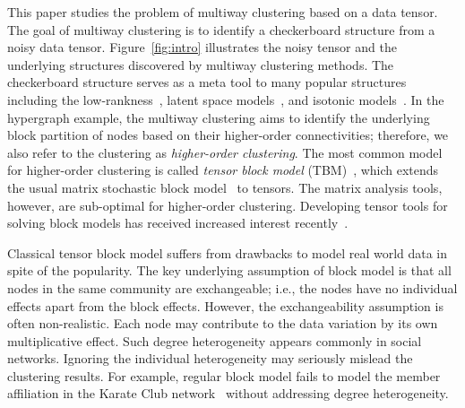 \documentclass[lettersize,onecolumn,journal]{IEEEtran}
\theoremstyle{definition}
\theoremstyle{definition}
\def\fixme#1#2{\textbf{\color{red}[FIXME (#1): #2]}}
\begin{document}


This paper studies the problem of multiway clustering based on a data tensor. The goal of multiway clustering is to identify a checkerboard structure from a noisy data tensor. Figure~\ref{fig:intro} illustrates the noisy tensor and the underlying structures discovered by multiway clustering methods. The checkerboard structure serves as a meta tool to many popular structures including the low-rankness~\citep{young2018universality}, latent space models~\citep{wang2018learning}, and isotonic models~\citep{pananjady2020isotonic}. In the hypergraph example, the multiway clustering aims to identify the underlying block partition of nodes based on their higher-order connectivities; therefore, we also refer to the clustering as \emph{higher-order clustering}. The most common model for higher-order clustering is called \emph{tensor block model} (TBM)~\citep{wang2019multiway}, which extends the usual matrix stochastic block model~\citep{abbe2017community} to tensors. 
The matrix analysis tools, however, are sub-optimal for higher-order clustering. Developing tensor tools for solving block models has received increased interest recently~\citep{ wang2019multiway,chi2020provable,han2020exact}. 


Classical tensor block model suffers from drawbacks to model real world data in spite of the popularity. The key underlying assumption of block model is that all nodes in the same community are exchangeable; i.e., the nodes have no individual effects apart from the block effects. However, the exchangeability assumption is often non-realistic. Each node may contribute to the data variation by its own multiplicative effect. Such degree heterogeneity appears commonly in social networks. {\color{blue} Ignoring the individual heterogeneity may seriously mislead the clustering results.} For example, regular block model fails to model {\color{blue} the member affiliation in} the Karate Club network~\citep{bickel2009nonparametric} without addressing
degree heterogeneity. 
\end{document}
